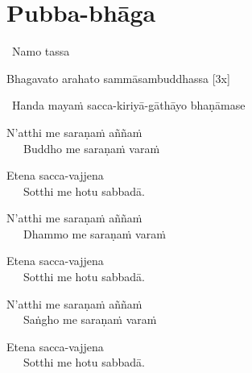 
\section{Pubba-bhāga}
\label{pubba-bhaga}


\begin{intro}
	\anglebracketleft\ \hspace{-0.5mm}Namo tassa \hspace{-0.5mm}\anglebracketright\
\end{intro}

Bhagavato arahato sammāsambuddhassa \hfill{[3x]}


\begin{center}
	\anglebracketleft\ \hspace{-0.5mm}Handa mayaṁ sacca-kiriyā-gāthāyo bhaṇāmase \hspace{-0.5mm}\anglebracketright\
\end{center}


\begin{hanging-indent}
N'atthi me saraṇaṁ aññaṁ\\
Buddho me saraṇaṁ varaṁ
\end{hanging-indent}
\begin{hanging-indent}
Etena sacca-vajjena\\
Sotthi me hotu sabbadā.
\end{hanging-indent}

\begin{hanging-indent}
N'atthi me saraṇaṁ aññaṁ\\
Dhammo me saraṇaṁ varaṁ
\end{hanging-indent}
\begin{hanging-indent}
Etena sacca-vajjena\\
Sotthi me hotu sabbadā.
\end{hanging-indent}

\begin{hanging-indent}
N'atthi me saraṇaṁ aññaṁ\\
Saṅgho me saraṇaṁ varaṁ
\end{hanging-indent}
\begin{hanging-indent}
Etena sacca-vajjena\\
Sotthi me hotu sabbadā.
\end{hanging-indent}

